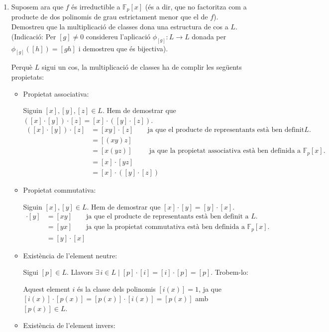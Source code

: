 \documentclass[11pt,a4paper]{article}
\begin{document}
\begin{enumerate}
\begin{enumerate}
        
        \item Suposem ara que $f$ és irreductible a $\mathbb{F}_p[x]$ (és a dir, que no factoritza com a producte de dos polinomis de grau estrictament menor que el de $f$). Demostreu que la multiplicació de classes dona una estructura de cos a $L$. (Indicació: Per $[g]\neq 0$ considereu l’aplicació $\phi_{[g]}:L\longrightarrow L$ donada per $\phi_{[g]}([h])=[gh]$ i demostreu que és bijectiva).\par
        Perquè $L$ sigui un cos, la multiplicació de classes ha de complir les següents propietats:
        \begin{itemize}
            \item Propietat associativa:\par
            Siguin $[x],[y],[z]\in L$. Hem de demostrar que $([x]\cdot[y])\cdot[z]=[x]\cdot([y]\cdot[z])$.
            \begin{align*}
                ([x]\cdot[y])\cdot[z]&=[xy]\cdot[z]\qquad\text{ja que el producte de representants està ben definit a $L$.}\\
                &=[(xy)z]\\
                &=[x(yz)]\qquad\;\,\text{ja que la propietat associativa està ben definida a $\mathbb{F}_p[x]$.}\\
                &=[x]\cdot[yz]\\
                &=[x]\cdot([y]\cdot[z])
            \end{align*}
            \item Propietat commutativa:\par
            Siguin $[x],[y]\in L$. Hem de demostrar que $[x]\cdot[y]=[y]\cdot[x]$.
            \begin{align*}
                [x]\cdot[y]&=[xy]\qquad\text{ja que el producte de representants està ben definit a $L$.}\\
                &=[yx]\qquad\text{ja que la propietat commutativa està ben definida a $\mathbb{F}_p[x]$.}\\
                &=[y]\cdot[x]
            \end{align*}
            \item Existència de l'element neutre:\par
            Sigui $[p]\in L$. Llavors $\exists\, i\in L \mid [p]\cdot[i]=[i]\cdot[p]=[p]$. Trobem-lo:\par Aquest element $i$ és la classe dels polinomis $[i(x)]=1$, ja que $[i(x)]\cdot[p(x)]=[p(x)]\cdot[i(x)]=[p(x)]$ amb $[p(x)]\in L$. 
            \item Existència de l'element invers:\par

\end{itemize}
\end{enumerate}
\end{enumerate}
\end{document}
